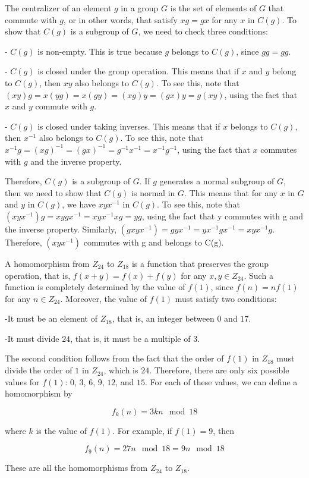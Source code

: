 \documentclass[a4paper, justified]{tufte-handout}
\begin{document}
\begin{solution}

	The centralizer of an element $g$ in a group $G$ is the set of elements of $G$ that commute with $g$, or in other words, that satisfy $xg = gx$ for any $x$ in $C(g)$. To show that $C(g)$ is a subgroup of $G$, we need to check three conditions:

	- $C(g)$ is non-empty. This is true because $g$ belongs to $C(g)$, since $gg = gg$.

	- $C(g)$ is closed under the group operation. This means that if $x$ and $y$ belong to $C(g)$, then $xy$ also belongs to $C(g)$. To see this, note that $(xy)g = x(yg) = x(gy) = (xg)y = (gx)y = g(xy)$, using the fact that $x$ and $y$ commute with $g$.

	- $C(g)$ is closed under taking inverses. This means that if $x$ belongs to $C(g)$, then $x^{-1}$ also belongs to $C(g)$. To see this, note that $x^{-1} g = (xg)^{-1} = (gx)^{-1} = g^{-1} x^{-1} = x^{-1} g^{-1}$, using the fact that $x$ commutes with $g$ and the inverse property.

	Therefore, $C(g)$ is a subgroup of $G$. If $g$ generates a normal subgroup of $G$, then we need to show that $C(g)$ is normal in $G$. This means that for any $x$ in $G$ and $y$ in $C(g)$, we have $xyx^{-1}$ in $C(g)$. To see this, note that $(xyx^{-1}) g = xygx^{-1} = xyx^{-1} xg = yg$, using the fact that y commutes with g and the inverse property. Similarly, $(gxyx^{-1}) = gyx^{-1} = yx^{-1} gx^{-1} = xyx^{-1} g$. Therefore, $(xyx^{-1})$ commutes with g and belongs to C(g).

\end{solution}


\begin{problem}[TJ 11-5]
\end{problem}

\begin{solution}
	A homomorphism from $Z_{24}$ to $Z_{18}$ is a function that preserves the group operation, that is, $f(x+y) = f(x) + f(y)$ for any $x,y \in Z_{24}$. Such a function is completely determined by the value of $f(1)$, since $f(n) = n f(1)$ for any $n \in Z_{24}$. Moreover, the value of $f(1)$ must satisfy two conditions:

	-It must be an element of $Z_{18}$, that is, an integer between $0$ and $17$.

	-It must divide $24$, that is, it must be a multiple of $3$.

	The second condition follows from the fact that the order of $f(1)$ in $Z_{18}$ must divide the order of $1$ in $Z_{24}$, which is $24$. Therefore, there are only six possible values for $f(1)$: $0$, $3$, $6$, $9$, $12$, and $15$. For each of these values, we can define a homomorphism by

	$$f_k(n) = 3kn \mod 18$$

	where $k$ is the value of $f(1)$. For example, if $f(1) = 9$, then

	$$f_9(n) = 27n \mod 18 = 9n \mod 18$$

	These are all the homomorphisms from $Z_{24}$ to $Z_{18}$.


\end{solution}
\end{document}
